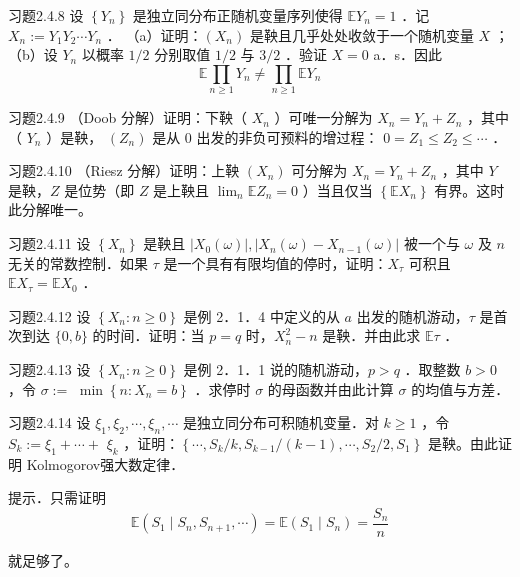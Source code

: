 \begin{namedthm}{习题2.4.8}
    设 $\left\{Y_{n}\right\}$ 是独立同分布正随机变量序列使得 $\mathbb{E} Y_{n}=1$ ．记 $X_{n}:=Y_{1} Y_{2} \cdots Y_{n}$ ．
（a）证明：$\left(X_{n}\right)$ 是鞅且几乎处处收敛于一个随机变量 $X$ ；
（b）设 $Y_{n}$ 以概率 $1 / 2$ 分别取值 $1 / 2$ 与 $3 / 2$ ．验证 $X=0$ a．s．因此
$$
\mathbb{E} \prod_{n \geq 1} Y_{n} \neq \prod_{n \geq 1} \mathbb{E} Y_{n}
$$
\end{namedthm}

\begin{namedthm}{习题2.4.9}
    （Doob 分解）证明：下鞅（ $X_{n}$ ）可唯一分解为 $X_{n}=Y_{n}+Z_{n}$ ，其中（ $Y_{n}$ ）是鞅， $\left(Z_{n}\right)$ 是从 0 出发的非负可预料的增过程： $0=Z_{1} \leq Z_{2} \leq \cdots$ ．
\end{namedthm}

\begin{namedthm}{习题2.4.10}
    （Riesz 分解）证明：上鞅 $\left(X_{n}\right)$ 可分解为 $X_{n}=Y_{n}+Z_{n}$ ，其中 $Y$ 是鞅，$Z$ 是位势（即 $Z$ 是上鞅且 $\lim _{n} \mathbb{E} Z_{n}=0$ ）当且仅当 $\left\{\mathbb{E} X_{n}\right\}$ 有界。这时此分解唯一。
\end{namedthm}

\begin{namedthm}{习题2.4.11}
    设 $\left\{X_{n}\right\}$ 是鞅且 $\left|X_{0}(\omega)\right|,\left|X_{n}(\omega)-X_{n-1}(\omega)\right|$ 被一个与 $\omega$ 及 $n$ 无关的常数控制．如果 $\tau$ 是一个具有有限均值的停时，证明：$X_{\tau}$ 可积且 $\mathbb{E} X_{\tau}=\mathbb{E} X_{0}$ ．
\end{namedthm}

\begin{namedthm}{习题2.4.12}
    设 $\left\{X_{n}: n \geq 0\right\}$ 是例 2．1．4 中定义的从 $a$ 出发的随机游动，$\tau$ 是首次到达 $\{0, b\}$ 的时间．证明：当 $p=q$ 时，$X_{n}^{2}-n$ 是鞅．并由此求 $\mathbb{E} \tau$ ．
\end{namedthm}

\begin{namedthm}{习题2.4.13}
    设 $\left\{X_{n}: n \geq 0\right\}$ 是例 2．1．1 说的随机游动，$p>q$ ．取整数 $b>0$ ，令 $\sigma:=$ $\min \left\{n: X_{n}=b\right\}$ ．求停时 $\sigma$ 的母函数并由此计算 $\sigma$ 的均值与方差．
\end{namedthm}

\begin{namedthm}{习题2.4.14}
    设 $\xi_{1}, \xi_{2}, \cdots, \xi_{n}, \cdots$ 是独立同分布可积随机变量．对 $k \geq 1$ ，令 $S_{k}:=\xi_{1}+\cdots+$ $\xi_{k}$ ，证明：$\left\{\cdots, S_{k} / k, S_{k-1} /(k-1), \cdots, S_{2} / 2, S_{1}\right\}$ 是鞅。由此证明 Kolmogorov强大数定律．

提示．只需证明
$$
\mathbb{E}\left(S_{1} \mid S_{n}, S_{n+1}, \cdots\right)=\mathbb{E}\left(S_{1} \mid S_{n}\right)=\frac{S_{n}}{n}
$$

就足够了。
\end{namedthm}

